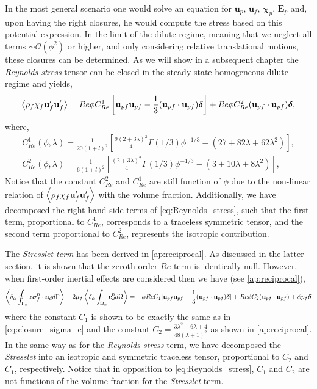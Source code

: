 In the most general scenario one would solve an equation for $\textbf{u}_p$, $\textbf{u}_f$, $\bm\chi_p$, $\textbf{E}_p$ and, upon having the right closures, he would compute the stress based on this potential expression. 
In the limit of the dilute regime, meaning that we neglect all terms $\sim \mathcal{O}(\phi^2)$ or higher, and only considering relative translational motions, these closures can be determined. 
As we will show in a subsequent chapter the \textit{Reynolds stress} tensor can be closed in the steady state homogeneous dilute regime and yields, 
\begin{equation}
    \left<\rho_f\chi_f\textbf{u}_f'\textbf{u}'_f\right>
    = Re  \phi C_{Re}^1 \left[
        \textbf{u}_{pf}
        \textbf{u}_{pf}
        -\frac{1}{3}
        (\textbf{u}_{pf}
        \cdot\textbf{u}_{pf})\bm\delta
    \right]
    + Re \phi C_{Re}^2 (\textbf{u}_{pf}\cdot\textbf{u}_{pf}) \bm\delta, 
    \label{eq:Reynolds_stress}
\end{equation}
where, 
\begin{align*}
    C_{Re}^1(\phi,\lambda)
    = \frac{1}{20(1+l)^2}\left[
        \frac{9(2+3\lambda)^2}{4}\Gamma(1/3) \phi^{-1/3}
        - (27+82\lambda +62\lambda^2)
    \right],\\
    C_{Re}^2(\phi,\lambda)
    = \frac{1}{6(1+l)^2}\left[
        \frac{(2+3\lambda)^2}{4}\Gamma(1/3) \phi^{-1/3}
        - (3+10\lambda +8\lambda^2)
    \right],
\end{align*}
Notice that the constant $C_{Re}^2$ and $C_{Re}^1$ are still function of $\phi$ due to the non-linear relation of $\left<\rho_f\chi_f\textbf{u}_f'\textbf{u}'_f\right>$ with the volume fraction. 
Additionally, we have decomposed the right-hand side terms of \ref{eq:Reynolds_stress}, such that the first term, proportional to $C_{Re}^1$, corresponds to a traceless symmetric tensor, and the second term proportional to $C_{Re}^2$, represents the isotropic contribution.  

The \textit{Stresslet term} has been derived in \ref{ap:reciprocal}. 
As discussed in the latter section, it is shown that the zeroth order $Re$ term is identically null. 
However, when first-order inertial effects are considered then we have (see \ref{ap:reciprocal}),
\begin{equation*}
    \left<\delta_\alpha \oint_{\Gamma_{\alpha}} \textbf{r}\bm{\sigma}_f^0 \cdot \textbf{n}_d d\Gamma\right>
    - 2 \mu_f \left<\delta_\alpha \int_{\Omega_{\alpha}} \textbf{e}_d^0 d\Omega\right>
    =
    - \phi Re C_1
    [
        \textbf{u}_{pf}\textbf{u}_{pf} - \frac{1}{3}(\textbf{u}_{pf}\cdot \textbf{u}_{pf})\bm\delta 
    ]
    + Re \phi C_2 (\textbf{u}_{pf}\cdot \textbf{u}_{pf}) 
    + \phi p_f \bm\delta
    \label{eq:stresslet_trans}
\end{equation*} 
where the constant $C_1$ is shown to be exactly the same as in \ref{eq:closure_sigma_e} and the constant $C_2 =\frac{3\lambda^2 + 6\lambda + 4}{48(\lambda +1 )^2}$ as shown in \ref{ap:reciprocal}. 
In the same way as for the \textit{Reynolds stress} term, we have decomposed the \textit{Stresslet} into an isotropic and symmetric traceless tensor, proportional to $C_2$ and $C_1$, respectively. 
Notice that in opposition to \ref{eq:Reynolds_stress}, $C_1$ and $C_2$ are not functions of the volume fraction for the \textit{Stresslet} term. 

